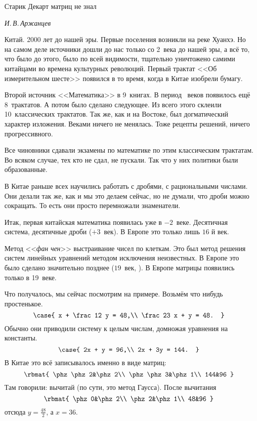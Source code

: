 \documentclass[a4paper,oneside,fleqn,10pt]{article}
\begin{document}
\epigraph{Старик Декарт матриц не знал}{\emph{И.\,В.\,Аржанцев}}

Китай. 2000 лет до нашей эры. Первые поселения возникли на реке
Хуанхэ.  Но на самом деле источники дошли до нас только со 2~века до
нашей эры, а всё то, что было до этого, было по всей видимости,
тщательно уничтожено самими китайцами во времена культурных революций.
Первый трактат <<Об измерительном шесте>> появился в то время, когда в
Китае изобрели бумагу.

Второй источник <<Математика>> в 9~книгах. В период ~веков
появилось ещё 8~трактатов.  А потом было сделано следующее. Из всего
этого склеили 10~классических трактатов.  Так же, как и на Востоке,
был догматический характер изложения.  Веками ничего не менялась. Тоже
рецепты решений, ничего прогрессивного.

Все чиновники сдавали экзамены по математике по этим классическим
трактатам.  Во всяком случае, тех кто не сдал, не пускали. Так что у
них политики были образованные.

В Китае раньше всех научились работать с дробями, с рациональными
числами.  Они делали так же, как и мы это делаем сейчас, но не думали,
что дроби можно сокращать.  То есть они просто перемножали
знаменатели.

Итак, первая китайская математика появилась уже в $-2$~веке.
Десятичная система, десятичные дроби ($+3$~век).  В Европе это только
лишь $16$ й век.

Метод <<\emph{фан чен}>> выстраивание чисел по клеткам.  Это был метод
решения систем линейных уравнений методом исключения неизвестных. В
Европе это было сделано значительно позднее ($19$~век, ).
В Европе матрицы появились только в 19~веке.

Что получалось, мы сейчас посмотрим на примере. Возьмём что нибудь
простенькое.
$$ \case{ x + \frac12 y = 48,\\ \frac23 x + y = 48.  }
$$ Обычно они приводили систему к целым числам, домножая уравнения на
константы.
$$ \case{ 2x + y = 96,\\ 2x + 3y = 144.  }
$$ В Китае это всё записывалось именно в виде матриц:
$$ \rbmat{ \phz\phz2&\phz2\\ \phz\phz3&\phz1\\ 144&96 }
$$ Там говорили: вычитай (по сути, это метод Гаусса). После вычитания
$$ \rbmat{ \phz0&\phz2\\ \phz2&\phz1\\ 48&96 }
$$ отсюда $y = \frac{48}{2}$, а $x = 36$.
\end{document}

